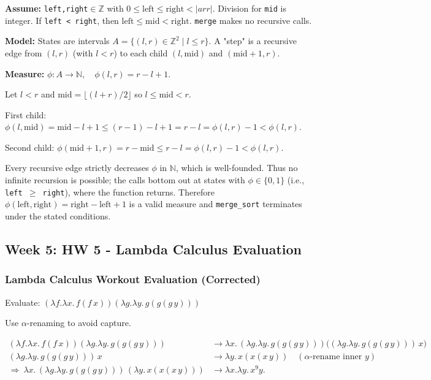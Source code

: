 \documentclass{article}
\theoremstyle{theorem}
\theoremstyle{definition}
\theoremstyle{remark}
\begin{document}
\textbf{Assume:} \texttt{left,right}$\in\mathbb{Z}$ with $0\le \text{left}\le \text{right}<|arr|$. Division for \texttt{mid} is integer. If \texttt{left < right}, then $\text{left}\le \text{mid}<\text{right}$. \texttt{merge} makes no recursive calls.

\textbf{Model:} States are intervals $A=\{(l,r)\in\mathbb Z^2\mid l\le r\}$. A "step" is a recursive edge from $(l,r)$ (with $l<r$) to each child $(l,\text{mid})$ and $(\text{mid}+1,r)$.

\textbf{Measure:} $\phi:A\to\mathbb N,\quad \phi(l,r)=r-l+1$.

Let $l<r$ and $\text{mid}=\lfloor(l+r)/2\rfloor$ so $l\le \text{mid}<r$.

First child: $\phi(l,\text{mid})=\text{mid}-l+1\le (r-1)-l+1=r-l=\phi(l,r)-1<\phi(l,r)$.

Second child: $\phi(\text{mid}+1,r)=r-\text{mid}\le r-l=\phi(l,r)-1<\phi(l,r)$.

Every recursive edge strictly decreases $\phi$ in $\mathbb N$, which is well-founded. Thus no infinite recursion is possible; the calls bottom out at states with $\phi\in\{0,1\}$ (i.e., \texttt{left $\geq$ right}), where the function returns. Therefore $\phi(\text{left},\text{right})=\text{right}-\text{left}+1$ is a valid measure and \texttt{merge\_sort} terminates under the stated conditions.

\subsection{Week 5: HW 5 - Lambda Calculus Evaluation}

\subsubsection{Lambda Calculus Workout Evaluation (Corrected)}

Evaluate: $(\lambda f.\lambda x.\,f(f\,x))(\lambda g.\lambda y.\,g(g(g\,y)))$

Use $\alpha$-renaming to avoid capture.

\[
\begin{aligned}
(\lambda f.\lambda x.\,f(f\,x))(\lambda g.\lambda y.\,g(g(g\,y)))
&\to \lambda x.\,(\lambda g.\lambda y.\,g(g(g\,y)))\big((\lambda g.\lambda y.\,g(g(g\,y)))\,x\big)\\
(\lambda g.\lambda y.\,g(g(g\,y)))\,x
&\to \lambda y.\,x(x(x\,y)) \quad (\text{$\alpha$-rename inner } y)\\
\Rightarrow\ \lambda x.\,(\lambda g.\lambda y.\,g(g(g\,y)))\,(\lambda y.\,x(x(x\,y)))
&\to \lambda x.\lambda y.\,x^9 y.
\end{aligned}
\]
\end{document}

